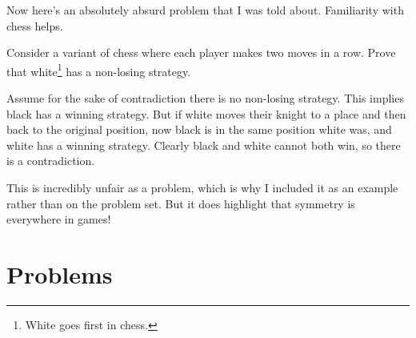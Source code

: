 \documentclass{article}
\begin{document}
Now here's an absolutely absurd problem that I was told about. Familiarity with chess helps.

\begin{exam}
Consider a variant of chess where each player makes two moves in a row. Prove that white\footnote{White goes first in chess.} has a non-losing strategy.
\end{exam}

\begin{sol}
Assume for the sake of contradiction there is no non-losing strategy. This implies black has a winning strategy. But if white moves their knight to a place and then back to the original position, now black is in the same position white was, and white has a winning strategy. Clearly black and white cannot both win, so there is a contradiction.
\end{sol}
This is incredibly unfair as a problem, which is why I included it as an example rather than on the problem set. But it does highlight that symmetry is everywhere in games!

\pagebreak

\section{Problems}
\end{document}
